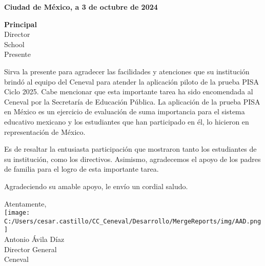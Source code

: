 \documentclass[letterpaper]{letter}
\begin{document}
\large

\vspace*{.5cm}  %

\begin{flushright}    
    \textbf{Ciudad de México, a 3 de octubre de 2024}   
\end{flushright} 
\vspace{3\baselineskip}
\textbf{{{Principal}} } \\
Director \\ 
{{School}} \\
Presente 

Sirva la presente para agradecer las facilidades y atenciones que su institución brindó al equipo del Ceneval para atender la aplicación piloto de la prueba PISA Ciclo 2025. Cabe mencionar que esta importante tarea ha sido encomendada al Ceneval por la Secretaría de Educación Pública. La aplicación de la prueba PISA en México es un ejercicio de evaluación de suma importancia para el sistema educativo mexicano y los estudiantes que han participado en él, lo hicieron en representación de México.

Es de resaltar la entusiasta participación que mostraron tanto los estudiantes de su institución, como los directivos. Asimismo, agradecemos el apoyo de los padres de familia para el logro de esta importante tarea.

Agradeciendo su amable apoyo, le envío un cordial saludo. 

\vspace{1\baselineskip}
\begin{center}
    Atentamente, \\    
    \vspace{1\baselineskip}
    \texttt{[image: C:/Users/cesar.castillo/CC\_Ceneval/Desarrollo/MergeReports/img/AAD.png]} \\
    \vspace{1\baselineskip}
    Antonio Ávila Díaz \\ 
    Director General \\ 
    Ceneval \\    
\end{center}
\end{document}

